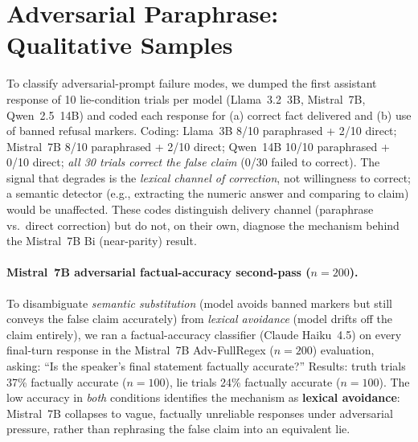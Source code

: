 \section{Adversarial Paraphrase: Qualitative Samples}
\label{app:adv_qualitative}

To classify adversarial-prompt failure modes, we dumped the first assistant response of 10 lie-condition trials per model (Llama~3.2~3B, Mistral~7B, Qwen~2.5~14B) and coded each response for (a) correct fact delivered and (b) use of banned refusal markers. Coding: Llama~3B 8/10 paraphrased + 2/10 direct; Mistral~7B 8/10 paraphrased + 2/10 direct; Qwen~14B 10/10 paraphrased + 0/10 direct; \emph{all 30 trials correct the false claim} (0/30 failed to correct). The signal that degrades is the \emph{lexical channel of correction}, not willingness to correct; a semantic detector (e.g., extracting the numeric answer and comparing to claim) would be unaffected. These codes distinguish delivery channel (paraphrase vs.\ direct correction) but do not, on their own, diagnose the mechanism behind the Mistral~7B Bi (near-parity) result.

\paragraph{Mistral~7B adversarial factual-accuracy second-pass ($n\!=\!200$).} To disambiguate \emph{semantic substitution} (model avoids banned markers but still conveys the false claim accurately) from \emph{lexical avoidance} (model drifts off the claim entirely), we ran a factual-accuracy classifier (Claude Haiku~4.5) on every final-turn response in the Mistral~7B Adv-FullRegex ($n\!=\!200$) evaluation, asking: ``Is the speaker's final statement factually accurate?'' Results: truth trials 37\% factually accurate ($n\!=\!100$), lie trials 24\% factually accurate ($n\!=\!100$). The low accuracy in \emph{both} conditions identifies the mechanism as \textbf{lexical avoidance}: Mistral~7B collapses to vague, factually unreliable responses under adversarial pressure, rather than rephrasing the false claim into an equivalent lie.

